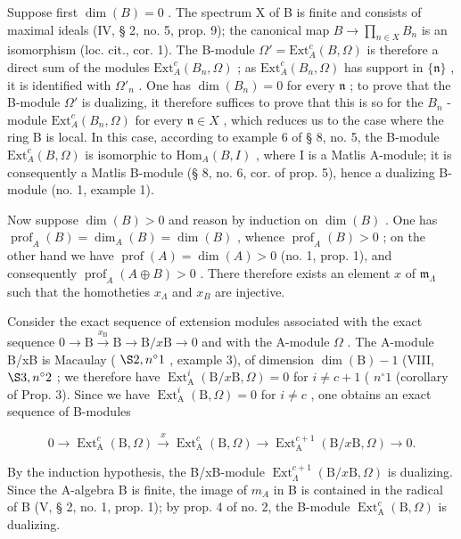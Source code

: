 Suppose first \(\dim(B) = 0\) . The spectrum X of B is finite and consists of maximal ideals (IV, § 2, no. 5, prop. 9); the canonical map \(B \to \prod_{n \in X} B_n\) is an isomorphism (loc. cit., cor. 1). The B-module \(\Omega' = \text{Ext}_A^c(B, \Omega)\) is therefore a direct sum of the modules \(\text{Ext}_A^c(B_n, \Omega)\) ; as \(\text{Ext}_A^c(B_n, \Omega)\) has support in \(\{\mathfrak{n}\}\) , it is identified with \(\Omega'_n\) . One has \(\dim(B_n) = 0\) for every \(\mathfrak{n}\) ; to prove that the B-module \(\Omega'\) is dualizing, it therefore suffices to prove that this is so for the \(B_n\) -module \(\text{Ext}_A^c(B_n, \Omega)\) for every \(\mathfrak{n} \in X\) , which reduces us to the case where the ring B is local. In this case, according to example 6 of § 8, no. 5, the B-module \(\text{Ext}_A^c(B, \Omega)\) is isomorphic to \(\text{Hom}_A(B, I)\) , where I is a Matlis A-module; it is consequently a Matlis B-module (§ 8, no. 6, cor. of prop. 5), hence a dualizing B-module (no. 1, example 1).

Now suppose \(\dim(B) > 0\) and reason by induction on \(\dim(B)\) . One has \(\operatorname{prof}_{A}(B) = \dim_{A}(B) = \dim(B)\) , whence \(\operatorname{prof}_{A}(B) > 0\) ; on the other hand we have \(\operatorname{prof}(A) = \dim(A) > 0\) (no. 1, prop. 1), and consequently \(\operatorname{prof}_{A}(A \oplus B) > 0\) . There therefore exists an element \(x\) of \(\mathfrak{m}_{\Lambda}\) such that the homotheties \(x_{\Lambda}\) and \(x_{B}\) are injective.

Consider the exact sequence of extension modules associated with the exact sequence \(0 \to \mathrm{B} \xrightarrow{x_{\mathrm{B}}} \mathrm{B} \longrightarrow \mathrm{B}/x\mathrm{B} \to 0\) and with the A-module \(\Omega\) . The A-module B/xB is Macaulay ( \(\S 2, n^{\circ} 1\) , example 3), of dimension \(\dim(\mathrm{B}) - 1\) (VIII, \(\S 3, n^{\circ} 2\) ; we therefore have \(\operatorname{Ext}_{\mathrm{A}}^{i}(\mathrm{B}/x\mathrm{B}, \Omega) = 0\) for \(i \neq c + 1\) ( \(n^{\circ} 1\) (corollary of Prop. 3). Since we have \(\operatorname{Ext}_{\mathrm{A}}^{i}(\mathrm{B}, \Omega) = 0\) for \(i \neq c\) , one obtains an exact sequence of B-modules

\[
0 \rightarrow \operatorname{Ext} _ {\mathrm{A}} ^ {c} (\mathrm{B}, \Omega) \xrightarrow {x} \operatorname{Ext} _ {\mathrm{A}} ^ {c} (\mathrm{B}, \Omega) \longrightarrow \operatorname{Ext} _ {\mathrm{A}} ^ {c + 1} (\mathrm{B} / x \mathrm{B}, \Omega) \rightarrow 0.
\]

By the induction hypothesis, the B/xB-module \(\operatorname{Ext}_{\Lambda}^{c+1}(\mathrm{B}/x\mathrm{B},\Omega)\) is dualizing. Since the A-algebra B is finite, the image of \(m_{A}\) in B is contained in the radical of B (V, § 2, no. 1, prop. 1); by prop. 4 of no. 2, the B-module \(\operatorname{Ext}_{\mathrm{A}}^{c}(\mathrm{B},\Omega)\) is dualizing.

